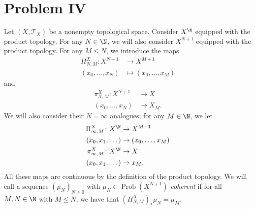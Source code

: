 \documentclass[10pt]{mypackage}
\begin{document}
\section{Problem IV}%
Let $\left( X,\mathcal{T}_X \right)$ be a nonempty topological space. Consider $X^{\N}$ equipped with the product topology. For any $N\in \N$, we will also consider $X^{N+1}$ equipped with the product topology. For any $M\leq N$, we introduce the maps
\begin{align*}
  \Pi_{N,M}^X\colon X^{N+1} &\to X^{M+1}\\
  \left( x_0,\dots,x_N \right) &\mapsto \left( x_0,\dots,x_M \right)
\end{align*}
and
\begin{align*}
  \pi_{N,M}^{X}\colon X^{N+1} &\to X\\
  \left( x_0,\dots,x_N \right) &\to X_M.
\end{align*}
We will also consider their $N = \infty$ analogues; for any $M\in \N$, we let
\begin{align*}
  \Pi_{\infty,M}^X\colon X^{\N} &\to X^{M+1}\\
  \left( x_0,x_1,\dots \right) &\to \left( x_0,\dots,x_M \right)\\
  \pi_{\infty,M}^{X}\colon X^{\N} &\to X\\
  \left( x_0,x_1,\dots \right) &\to x_M.
\end{align*}
All these maps are continuous by the definition of the product topology. We will call a sequence $\left( \mu_N \right)_{N\geq 0}$ with $\mu_N\in \operatorname{Prob}\left( X^{N+1} \right)$ \textit{coherent} if for all $M,N\in \N$ with $M\leq N$, we have that $\left( \Pi^{X}_{N,M} \right)_{\ast}\mu_N = \mu_M$.
\end{document}

